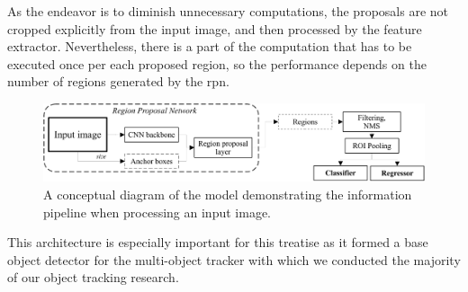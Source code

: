 As the endeavor is to diminish unnecessary computations, the proposals are not cropped explicitly from the input image, and then processed by the feature extractor. Nevertheless, there is a part of the computation that has to be executed once per each proposed region, so the performance depends on the number of regions generated by the \gls{rpn}.

\begin{figure}[t]
    \centerline{\includegraphics[width=\linewidth]{figures/theoretical_foundations/fastercnn_diagram.pdf}}
    \caption[\fasterrcnn{} processing diagram]{A conceptual diagram of the \fasterrcnn{} model demonstrating the information pipeline when processing an input image.}
    \label{fig:FasterRCNNPipeline}
\end{figure}

This architecture is especially important for this treatise as it formed a base object detector for the multi-object tracker with which we conducted the majority of our object tracking research.
